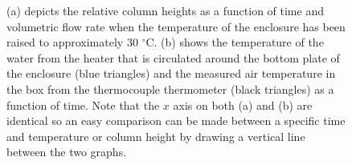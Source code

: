 \begin{figure}
\begin{center}
\end{center}
\caption[Heat system to 30 $^{\circ}\text{C}$]{\label{fig:30}(a) depicts the relative column heights as a function of time and volumetric flow rate when the temperature of the enclosure has been raised to approximately 30 $^{\circ}\text{C}$. (b) shows the temperature of the water from the heater that is circulated around the bottom plate of the enclosure (blue triangles) and the measured air temperature in the box from the thermocouple thermometer (black triangles) as a function of time. Note that the $x$ axis on both (a) and (b) are identical so an easy comparison can be made between a specific time and temperature or column height by drawing a vertical line between the two graphs.}
\end{figure}

